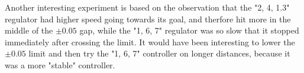 \documentclass[a4paper,10pt]{article}
\begin{document}
		Another interesting experiment is based on the observation that the "2, 4, 1.3" regulator had higher speed going towards its goal, and therfore hit more in the middle of the $\pm0.05$ gap,
		while the "1, 6, 7" regulator was so slow that it stopped immediately after crossing the limit. It would have been interesting to lower the $\pm0.05$ limit and then try the "1, 6, 7" controller on
		longer distances, because it was a more "stable" controller.
		
		
\end{document}
